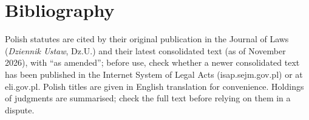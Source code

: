 \makeatletter
\providecommand{\BibItem}[2]{\item[\textbf{[#1]}]\def\@currentlabel{#1}\def\@currentlabelname{#1}\phantomsection\label{bib:#2}}
\makeatother
\providecommand{\Zr}[1]{[\ref{bib:#1}]}
\newenvironment{BibList}{\begin{list}{}{\setlength{\labelwidth}{2.6cm}\setlength{\leftmargin}{2.9cm}\setlength{\labelsep}{0.3cm}\setlength{\itemsep}{0.15em}\setlength{\parsep}{0pt}\small}}{\end{list}}

\chapter*{Bibliography}

Polish statutes are cited by their original publication in the Journal of Laws (\emph{Dziennik Ustaw}, Dz.U.) and their latest consolidated text (as of November 2026), with “as amended”; before use, check whether a newer consolidated text has been published in the Internet System of Legal Acts (isap.sejm.gov.pl) or at eli.gov.pl. Polish titles are given in English translation for convenience. Holdings of judgments are summarised; check the full text before relying on them in a dispute.

